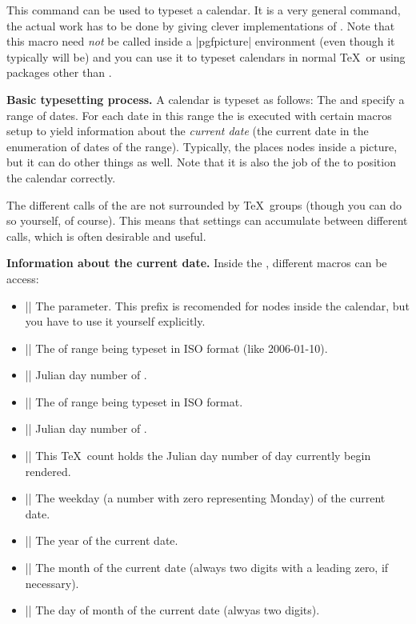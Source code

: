 \begin{command}{\pgfcalendar{}}
  This command can be used to typeset a calendar. It is a very general
  command, the actual work has to be done by giving clever
  implementations of . Note that this macro need
  \emph{not} be called inside a |{pgfpicture}| environment (even
  though it typically will be) and you can use it to typeset calendars
  in normal \TeX\ or using packages other than \pgfname.

  \medskip
  \textbf{Basic typesetting process.}
  A calendar is typeset as follows: The  and
   specify a range of dates. For each date in this 
  range the  is executed with certain macros
  setup to yield information about the \emph{current date}
  (the current date in the enumeration of dates of the
  range). Typically, the  places nodes inside a
  picture, but it can do other things as well. Note that it is also
  the job of the  to position the calendar
  correctly. 

  The different calls of the  are not
  surrounded by \TeX\ groups (though you can do so yourself, of
  course). This means that settings can accumulate between different
  calls, which is often desirable and useful.

  \medskip
  \textbf{Information about the current date.}
  Inside the , different macros can be access:

  \begin{itemize}
  \item |\pgfcalendarprefix|
    The  parameter. This prefix is recomended for nodes
    inside the calendar, but you have to use it yourself explicitly.
  \item |\pgfcalendarbeginiso|
    The  of range being typeset in ISO format (like 2006-01-10).
  \item |\pgfcalendarbeginjulian|
    Julian day number of .
  \item |\pgfcalendarendiso|
    The  of range being typeset in ISO format.
  \item |\pgfcalendarendjulian|
    Julian day number of .
  \item |\pgfcalendarcurrentjulian| This \TeX\ count holds the 
    Julian day number of day currently begin rendered.
  \item |\pgfcalendarcurrentweekday| The weekday
    (a number with zero representing Monday) of the current date.
  \item |\pgfcalendarcurrentyear| The year of the current date.
  \item |\pgfcalendarcurrentmonth| The month of the current date
    (always two digits with a leading zero, if necessary).
  \item |\pgfcalendarcurrentday| The day of month of the current date
    (alwyas two digits).
  \end{itemize}


\end{command}

